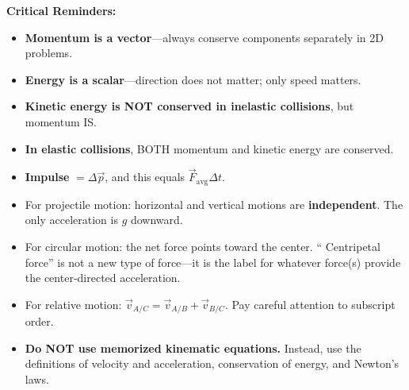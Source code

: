 \documentclass[12pt,letterpaper]{article}
\begin{document}
\begin{importantbox}
\textbf{Critical Reminders:}
\begin{itemize}
    \item \textbf{Momentum is a vector}---always conserve components separately in 2D problems.
    \item \textbf{Energy is a scalar}---direction does not matter; only speed matters.
    \item \textbf{Kinetic energy is NOT conserved in inelastic collisions}, but momentum IS.
    \item \textbf{In elastic collisions}, BOTH momentum and kinetic energy are conserved.
    \item \textbf{Impulse} $= \Delta \vec{p}$, and this equals $\vec{F}_{\text{avg}} \Delta t$.
    \item For projectile motion: horizontal and vertical motions are \textbf{independent}. The only acceleration is $g$ downward.
    \item For circular motion: the net force points toward the center. ``
Centripetal force'' is not a new type of force---it is the label for whatever force(s) provide the center-directed acceleration.
    \item For relative motion: $\vec{v}_{A/C} = \vec{v}_{A/B} + \vec{v}_{B/C}$. Pay careful attention to subscript order.
    \item \textbf{Do NOT use memorized kinematic equations.} Instead, use the definitions of velocity and acceleration, conservation of energy, and Newton's laws.
\end{itemize}
\end{importantbox}
\end{document}
